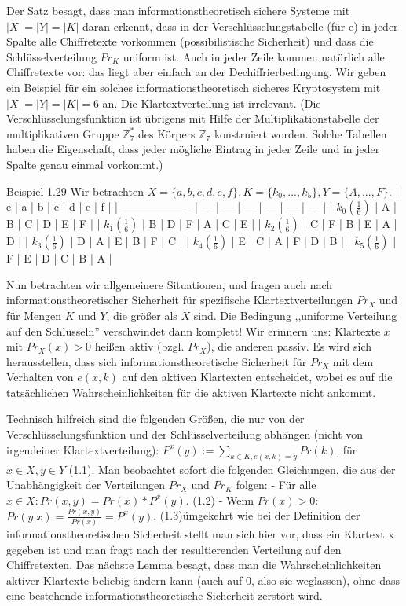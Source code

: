 \documentclass[a4paper]{article}
\begin{document}
\begin{multicols}{3}
    Der Satz besagt, dass man informationstheoretisch sichere Systeme mit $|X|=|Y|=|K|$ daran erkennt, dass in der Verschlüsselungstabelle (für e) in jeder Spalte alle Chiffretexte vorkommen (possibilistische Sicherheit) und dass die Schlüsselverteilung $Pr_K$ uniform ist. Auch in jeder Zeile kommen natürlich alle Chiffretexte vor: das liegt aber einfach an der Dechiffrierbedingung.
    Wir geben ein Beispiel für ein solches informationstheoretisch sicheres Kryptosystem mit $|X|=|Y|=|K|=6$ an. Die Klartextverteilung ist irrelevant. (Die Verschlüsselungsfunktion ist übrigens mit Hilfe der Multiplikationstabelle der multiplikativen Gruppe $\mathbb{Z}^*_7$ des Körpers $\mathbb{Z}_7$ konstruiert worden. Solche Tabellen haben die Eigenschaft, dass jeder mögliche Eintrag in jeder Zeile und in jeder Spalte genau einmal vorkommt.)

    Beispiel 1.29 Wir betrachten $X=\{a,b,c,d,e,f\},K=\{k_0 ,...,k_5\},Y=\{A,...,F\}$.
    | e                   | a   | b   | c   | d   | e   | f   |
    | ------------------- | --- | --- | --- | --- | --- | --- |
    | $k_0 (\frac{1}{6})$ | A   | B   | C   | D   | E   | F   |
    | $k_1 (\frac{1}{6})$ | B   | D   | F   | A   | C   | E   |
    | $k_2 (\frac{1}{6})$ | C   | F   | B   | E   | A   | D   |
    | $k_3 (\frac{1}{6})$ | D   | A   | E   | B   | F   | C   |
    | $k_4 (\frac{1}{6})$ | E   | C   | A   | F   | D   | B   |
    | $k_5 (\frac{1}{6})$ | F   | E   | D   | C   | B   | A   |

    Nun betrachten wir allgemeinere Situationen, und fragen auch nach informationstheoretischer Sicherheit für spezifische Klartextverteilungen $Pr_X$ und für Mengen $K$ und $Y$, die größer als $X$ sind. Die Bedingung ,,uniforme Verteilung auf den Schlüsseln'' verschwindet dann komplett! Wir erinnern uns: Klartexte $x$ mit $Pr_X(x)> 0$ heißen aktiv (bzgl. $Pr_X$), die anderen passiv. Es wird sich herausstellen, dass sich informationstheoretische Sicherheit für $Pr_X$ mit dem Verhalten von $e(x,k)$ auf den aktiven Klartexten entscheidet, wobei es auf die tatsächlichen Wahrscheinlichkeiten für die aktiven Klartexte nicht ankommt.

    Technisch hilfreich sind die folgenden Größen, die nur von der Verschlüsselungsfunktion und der Schlüsselverteilung abhängen (nicht von irgendeiner Klartextverteilung): $P^x(y):=\sum_{k\in K, e(x,k)=y} Pr(k)$, für $x\in X,y\in Y$ (1.1).
    Man beobachtet sofort die folgenden Gleichungen, die aus der Unabhängigkeit der Verteilungen $Pr_X$ und $Pr_K$ folgen:
    - Für alle $x\in X:Pr(x,y) = Pr(x)*P^x(y)$. (1.2)
    - Wenn $Pr(x)> 0$:$Pr(y|x) = \frac{Pr(x,y)}{Pr(x)}=P^x(y)$. (1.3)ümgekehrt wie bei der Definition der informationstheoretischen Sicherheit stellt man sich hier vor, dass ein Klartext x gegeben ist und man fragt nach der resultierenden Verteilung auf den Chiffretexten.
    Das nächste Lemma besagt, dass man die Wahrscheinlichkeiten aktiver Klartexte beliebig ändern kann (auch auf 0, also sie weglassen), ohne dass eine bestehende informationstheoretische Sicherheit zerstört wird.


\end{multicols}
\end{document}
